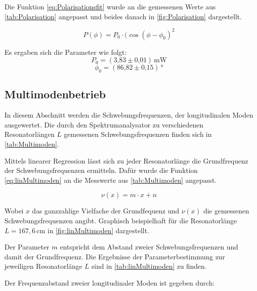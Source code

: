 Die Funktion \autoref{eq:Polarisationsfit} wurde an die gemessenen Werte aus \autoref{tab:Polarisation} angepasst und beides danach in \autoref{fig:Polarisation} dargestellt.


\begin{equation}
P(\phi) = P_0\cdot(\cos(\phi - \phi_0)^{2}
\label{eq:Polarisationsfit}
\end{equation}

Es ergaben sich die Parameter wie folgt:
\begin{equation}
P_0 = (\text{3,83} \pm \text{0,01})\,\text{mW}
\end{equation}
\begin{equation}
\phi_0 = (\text{86,82} \pm \text{0,15})\,\text{°}
\end{equation}







\subsection{Multimodenbetrieb}
\label{sec:Multimodenbetrieb}

In diesem Abschnitt werden die Schwebungsfrequenzen, der longitudinalen Moden ausgewertet. 
Die durch den Spektrumanalysator zu verschiedenen Resonatorlängen $L$ gemessenen Schwebungsfrequenzen finden sich in \autoref{tab:Multimoden}.



Mittels linearer Regression lässt sich zu jeder Resonatorlänge die Grundfrequenz der Schwebungsfrequenzen ermitteln. Dafür wurde die Funktion \autoref{eq:linMultimoden} an die Messwerte aus \autoref{tab:Multimoden} angepasst. 

\begin{equation}
\nu (x) = m \cdot x + n
\label{eq:linMultimoden}
\end{equation}

Wobei $x$ das ganzzahlige Vielfache der Grundfequenz und $\nu (x)$ die gemessenen Schwebungsfrequenzen angibt. Graphisch beispielhaft für die Resonatorlänge $L = 167,6\,\text{cm}$ in \autoref{fig:linMultimoden} dargestellt.

Der Parameter $m$ entspricht dem Abstand zweier Schwebungsfrequenzen und damit der Grundfrequenz. Die Ergebnisse der Parameterbestimmung zur jeweiligen Resonatorlänge $L$ sind in \autoref{tab:linMultimoden} zu finden.



Der Frequenzabstand zweier longitudinaler Moden ist gegeben durch:

